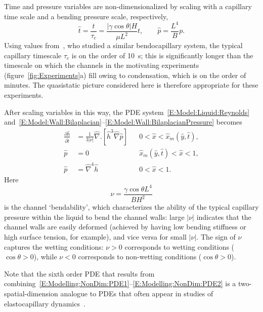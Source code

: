 \documentclass{jfm}
\newcommand{\ddp}[2]{\frac{\partial #1}{\partial #2}}
\newcommand{\bendability}{\nu}
\begin{document}
Time and pressure variables are non-dimensionalized by scaling with a capillary time scale and a bending pressure scale, respectively,
\begin{equation}\label{E:Modelling:NonDim:TimeAndPressureScaling}
\hat{t} =\frac{t}{ \tau_c} =  \frac{|\gamma \cos \theta| H}{\mu L^2}t, \qquad \hat{p} = \frac{L^4}{B}p.
\end{equation}
Using values from~\citet{Bradley2019PRL}, who studied a similar bendocapillary system, the typical capillary timescale $\tau_c$ is on the order of 10~s; this is significantly longer than the timescale on which the channels in the motivating experiments (figure~\ref{fig:Experiments}a) fill owing to condensation, which is on the order of minutes. The quasistatic picture considered here is therefore appropriate for these experiments.

After scaling variables in this way, the PDE system~\eqref{E:Model:Liquid:Reynolds} and~\eqref{E:Model:Wall:Bilaplacian}--\eqref{E:Model:Wall:BilaplacianPressure} becomes
\begin{align}
\ddp{\hat{h}}{\hat{t}} &=\frac{1}{3|\nu|}\hat{\nabla}. \left[\hat{h}^3\hat{\nabla}\hat{p}  \right] & & 0 <  \hat{x} < \hat{x}_m(\hat{y},\hat{t}),\label{E:Modelling:NonDim:PDE1}\\
  \hat{p}&=0 & &
\hat{x}_m(\hat{y},\hat{t}) < \hat{x} < 1,\label{E:Modelling:NonDim:PDE2}\\
\hat{p} &=\hat{\nabla}^4 \hat{h}& &0 < \hat{x} < 1.\label{E:Modelling:NonDim:PDE3}
\end{align}
Here
\begin{equation}\label{E:Modelling:NonDim:Bendability}
\bendability = \frac{\gamma \cos \theta L^4}{B H^2}
\end{equation}
is the channel `bendability', which characterizes the ability of the typical capillary pressure within the liquid to bend the channel walls: large $|\nu|$ indicates that the channel walls are easily deformed (achieved by having low bending stiffness or high surface tension, for example), and vice versa for small $|\nu|$. The sign of $\nu$ captures the wetting conditions: $\nu > 0$ corresponds to wetting conditions ($\cos \theta >0$), while $\nu < 0$ corresponds to non-wetting conditions ($\cos \theta >0$).

Note that the sixth order PDE that results from combining~\eqref{E:Modelling:NonDim:PDE1}--\eqref{E:Modelling:NonDim:PDE2} is a two-spatial-dimension analogue to PDEs that often appear in studies of elastocapillary dynamics~\citep[see][for example]{Flitton2004EJApplMech, Duprat2011JFM, Aristoff2011IntJNonlinMech}.
\end{document}
